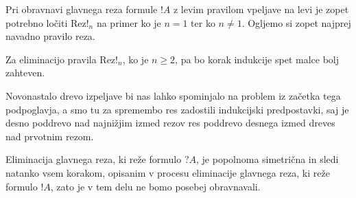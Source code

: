 \dol
\begin{prooftree}


\end{prooftree}
Pri obravnavi glavnega reza formule $!A$ z levim pravilom vpeljave na levi je zopet potrebno ločiti Rez!$_n$ na primer ko je $n=1$ ter ko $n\neq1$. Ogljemo si zopet najprej navadno pravilo reza.
\begin{prooftree}


\end{prooftree}
\dol
\begin{prooftree}
\end{prooftree}
Za eliminacijo pravila Rez!$_n$, ko je $n\geq2$, pa bo korak indukcije spet malce bolj zahteven.
\begin{prooftree}


\end{prooftree}
\dol
\begin{prooftree}



\end{prooftree}
Novonastalo drevo izpeljave bi nas lahko spominjalo na problem iz začetka tega podpoglavja, a smo tu za spremembo res zadostili indukcijski predpostavki, saj je desno poddrevo nad najnižjim izmed rezov res poddrevo desnega izmed dreves nad prvotnim rezom.

Eliminacija glavnega reza, ki reže formulo $?A$, je popolnoma simetrična in sledi natanko vsem korakom, opisanim v procesu eliminacije glavnega reza, ki reže formulo $!A$, zato je v tem delu ne bomo posebej obravnavali.
